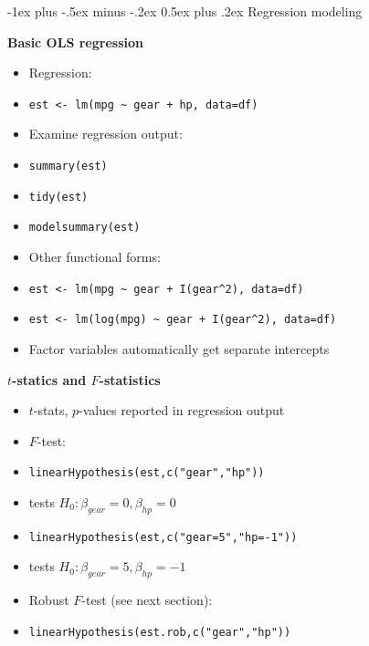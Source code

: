 \documentclass[10pt,landscape]{article}
\makeatletter
\renewcommand{\section}{\@startsection{section}{1}{0mm}%
                                {-1ex plus -.5ex minus -.2ex}%
                                {0.5ex plus .2ex}%
                                {\normalfont\large\bfseries}}
\makeatother
\begin{document}
\begin{multicols}{3}
\section{Regression modeling}

\smallskip{}

\textbf{Basic OLS regression}\\
\begin{itemize}
    \item Regression:
    \item[] \verb!est <- lm(mpg ~ gear + hp, data=df)!
    \item Examine regression output:
    \item[] \verb!summary(est)!
    \item[] \verb!tidy(est)!
    \item[] \verb!modelsummary(est)!
    \item Other functional forms:
    \item[] \verb!est <- lm(mpg ~ gear + I(gear^2), data=df)!
    \item[] \verb!est <- lm(log(mpg) ~ gear + I(gear^2), data=df)!
    \item Factor variables automatically get separate intercepts
\end{itemize}

\smallskip{}

\textbf{$t$-statics and $F$-statistics}\\
\begin{itemize}
    \item $t$-stats, $p$-values reported in regression output
    \item $F$-test:
    \item[] \verb!linearHypothesis(est,c("gear","hp"))!
    \item[] tests $H_0: \beta_{gear} = 0, \beta_{hp}=0$
    \item[] \verb!linearHypothesis(est,c("gear=5","hp=-1"))!
    \item[] tests $H_0: \beta_{gear} = 5, \beta_{hp}=-1$
    \item Robust $F$-test (see next section):
    \item[] \verb!linearHypothesis(est.rob,c("gear","hp"))!
\end{itemize}

\smallskip{}


\end{multicols}
\end{document}
